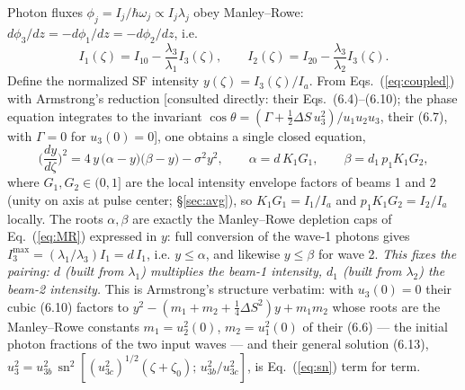 \documentclass[aps,pra,preprint,amsmath,amssymb,nofootinbib,superscriptaddress]{revtex4-2}
\newcommand{\sn}{\operatorname{sn}}
\begin{document}
Photon fluxes $\phi_j = I_j/\hbar\omega_j \propto I_j\lambda_j$ obey
Manley--Rowe: $d\phi_3/dz=-d\phi_1/dz=-d\phi_2/dz$, i.e.
\begin{equation}
I_1(\zeta)=I_{10}-\frac{\lambda_3}{\lambda_1}I_3(\zeta),\qquad
I_2(\zeta)=I_{20}-\frac{\lambda_3}{\lambda_2}I_3(\zeta).
\label{eq:MR}
\end{equation}
Define the normalized SF intensity $y(\zeta)=I_3(\zeta)/I_a$. From
Eqs.~(\ref{eq:coupled}) with Armstrong's reduction [consulted directly:
their Eqs.~(6.4)--(6.10); the phase equation integrates to the invariant
$\cos\theta=(\Gamma+\tfrac12\Delta S\,u_3^2)/u_1u_2u_3$, their (6.7), with
$\Gamma=0$ for $u_3(0)=0$], one obtains a single closed equation,
\begin{equation}
\Big(\frac{dy}{d\zeta}\Big)^{2}
   = 4\,y\,\big(\alpha-y\big)\big(\beta-y\big)-\sigma^{2}y^{2},
\qquad
\alpha = d\,K_1 G_1,\qquad
\beta  = d_1\,p_1 K_1 G_2 ,
\label{eq:cubic}
\end{equation}
where $G_1,G_2\in(0,1]$ are the local intensity envelope factors of beams 1
and 2 (unity on axis at pulse center; \S\ref{sec:avg}), so $K_1G_1=I_1/I_a$
and $p_1K_1G_2=I_2/I_a$ locally. The roots $\alpha,\beta$ are exactly the
Manley--Rowe depletion caps of Eq.~(\ref{eq:MR}) expressed in $y$: full
conversion of the wave-1 photons gives
$I_3^{\max}=(\lambda_1/\lambda_3)I_1=d\,I_1$, i.e. $y\le\alpha$, and
likewise $y\le\beta$ for wave 2. \emph{This fixes the pairing: $d$ (built
from $\lambda_1$) multiplies the beam-1 intensity, $d_1$ (built from
$\lambda_2$) the beam-2 intensity.} This is Armstrong's structure
verbatim: with $u_3(0)=0$ their cubic (6.10) factors to
$y^2-(m_1+m_2+\tfrac14\Delta S^2)y+m_1m_2$ whose roots are the
Manley--Rowe constants $m_1=u_2^2(0)$, $m_2=u_1^2(0)$ of their (6.6) ---
the initial photon fractions of the two input waves --- and their general
solution (6.13),
$u_3^2 = u_{3b}^2\,\sn^2[(u_{3c}^2)^{1/2}(\zeta+\zeta_0);\,
u_{3b}^2/u_{3c}^2]$,
is Eq.~(\ref{eq:sn}) term for term.
\end{document}
